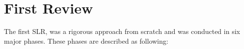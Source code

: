\documentclass[a4paper,11pt,article,oneside]{memoir}
\begin{document}



\section{First Review}

The first SLR, was a rigorous approach from scratch and was conducted in six major phases. These phases are described as following:

\end{document}
